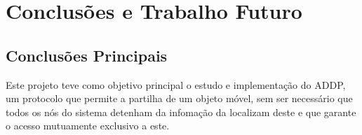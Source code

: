 \chapter{Conclusões e Trabalho Futuro}
\label{chap:conc-trab-futuro}

\section{Conclusões Principais}
\label{sec:conc-princ}

\begin{comment}
    Lições aprendidas
    - Implementaçã de um sistema concorrente e distribuído
    - Evitar race conditions
    - Oportunidade de usar Mecanismos de Sincronização e Concorrência

    Pontos Principais
    - o que é que foi possível fazer
    - o que é em geral este trabalho/implementação
    - possível implementação moderna com visualização do algoritmo 

    Neste trabalho foi possível estudar e implementar o sistema concorrente e distribuído, que faz uso do ``Arrow Distributed Directory Protocol''.
    O que torna notável este protocolo é o mecanismo de inversão ou troca de ligações, que mesmo sendo simples,
    evita que mais que um elemento no sistema tenha acesso a um objeto que pretendemos ter o acesso exclusivo, isto é, evita falhas de Condições de Corrida.
    Este tipo de falhas pode ter grande impacto no bom funcionamento de programas concorrentes, pois a leitura e/ou escrita concorrente de 
    informação pode levar a resultados imprevisíveis. 

    Após um estudo do o artigo que introduz o \acs{ADDP} \cite{Arrow}, que permitiu a realização de uma especificação dos elementos que pertencem ao sistema definido por o protocolo estudado,
    esta que foi usada como base no planeamento e implementação do projeto.
    No desenvolvimento do programa executado no sistema distribuído, foi possível praticar o uso de mecanismos de sincronização e concorrentes, estes oferecidos pela Linguagem \emph{Go},
    a linguagem escolhida para a implementação.
    Para além da implementação do programa distribuído, foi desenvolvida uma interface, que permitiu visualizar o protocolo em ação, testar a implementação, e provar (parcialmente) o seu
    bom funcionamento e fidelidade com o descrito na Especificação.
\end{comment}


Este projeto teve como objetivo principal o estudo e implementação do \acs{ADDP}, um protocolo que permite a partilha de um objeto móvel, sem ser necessário
que todos os nós do sistema detenham da infomação da localizam deste e que garante o acesso mutuamente exclusivo a este. \\


